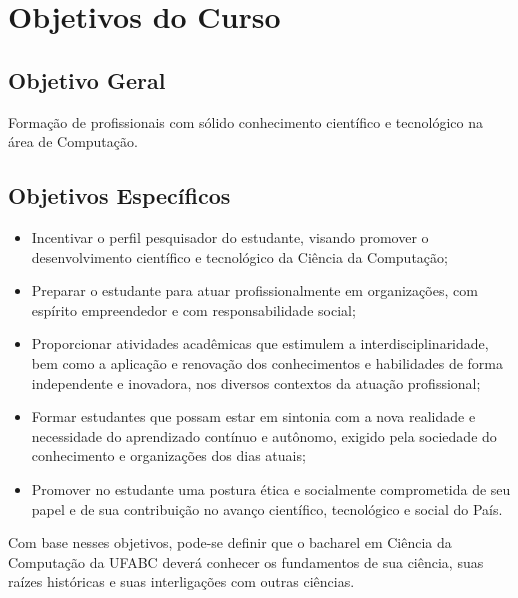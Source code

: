 \section {Objetivos do Curso}

\subsection{Objetivo Geral}
Formação de profissionais com sólido conhecimento científico e tecnológico na área de Computação.

\subsection{Objetivos Específicos}
\begin{itemize}
	\item Incentivar o perfil pesquisador do estudante, visando promover o desenvolvimento científico e tecnológico da Ciência da Computação;
	\item Preparar o estudante para atuar profissionalmente em organizações, com espírito empreendedor e com responsabilidade social;
	\item Proporcionar atividades acadêmicas que estimulem a interdisciplinaridade, bem como a aplicação e renovação dos conhecimentos e habilidades de forma independente e inovadora, nos diversos contextos da atuação profissional;
	\item Formar estudantes que possam estar em sintonia com a nova realidade e necessidade do aprendizado contínuo e autônomo, exigido pela sociedade do conhecimento e organizações dos dias atuais;
	\item Promover no estudante uma postura ética e socialmente comprometida de seu papel e de sua contribuição no avanço científico, tecnológico e social do País.
	
\end{itemize}
Com base nesses objetivos, pode-se definir que o bacharel em Ciência da Computação da
UFABC deverá conhecer os fundamentos de sua ciência, suas raízes históricas e suas
interligações com outras ciências.

